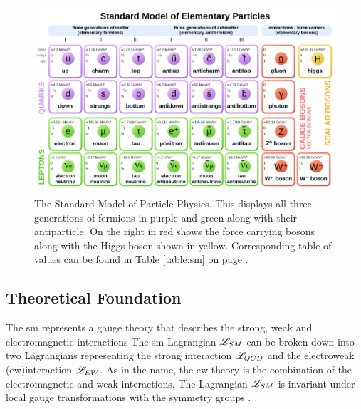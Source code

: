 \begin{figure}
\centering
\includegraphics[width=1\textwidth]{figs/ch2/standard_model}
\caption{The Standard Model of Particle Physics. This displays all three generations of fermions 
in purple and green along with their antiparticle. On the right in red shows the force carrying
bosons along with the Higgs boson shown in yellow. Corresponding table of values can be 
found in Table \ref*{table:sm} on page \pageref*{table:sm}. }
\label{fig:sm_fig}
\end{figure}

\subsection{Theoretical Foundation}

The \gls{sm} represents a gauge theory that describes the strong, weak and electromagnetic interactions  
The \gls{sm} Lagrangian $\mathscr{L}_{SM}$ can be broken down into two Lagrangians representing the strong interaction $\mathscr{L}_{QCD}$
and the electroweak (\gls{ew})interaction $\mathscr{L}_{EW}$. As in the name, the \gls{ew} theory is the combination of the electromagnetic 
and weak interactions. The Lagrangian $\mathscr{L}_{SM}$ is invariant under local gauge transformations with the symmetry groups \cite{pich}.

